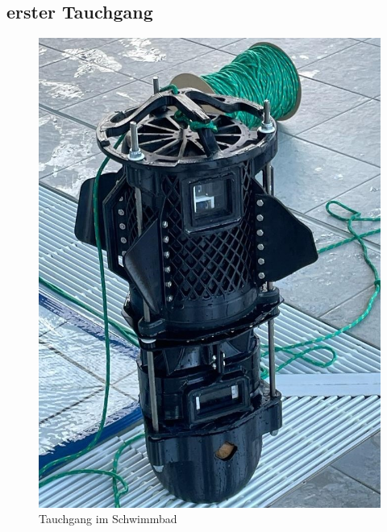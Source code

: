 \documentclass[11pt]{article}
\begin{document}
\endgroup

\newpage
\subsection{erster Tauchgang}
\begingroup
\begin{figure}
\centering
  \includegraphics[width=\linewidth]{Ubert2SWN.jpeg}
  \caption{Tauchgang im Schwimmbad}
\end{figure}
\Tauchgang
\end{document}
